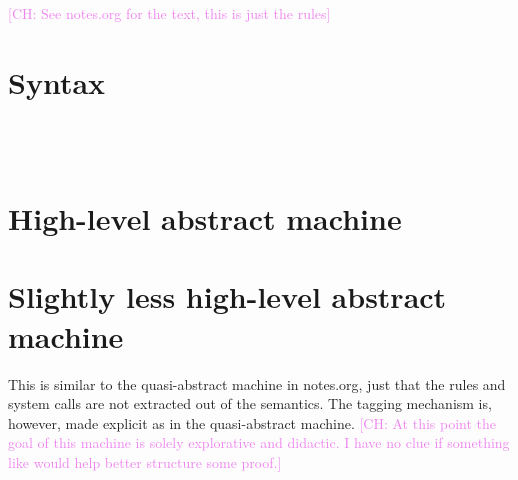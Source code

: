 \documentclass{article}
\newcommand{\comm}[3]{\textcolor{#1}{[#2: #3]}}
\newcommand{\ch}[1]{\comm{violet}{CH}{#1}} %
\begin{document}
\ch{See notes.org for the text, this is just the rules}

\section{Syntax}

\ottmetavars\\[0pt]

\ottgrammartabular{
\ottframe\ottinterrule
\ottp\ottinterrule
\ottn\ottinterrule
\ottu\ottinterrule
\ottinstr\ottinterrule
\otte\ottinterrule
\ottS\ottinterrule
}\\[5.0mm]

\section{High-level abstract machine}

\ottdefnsAbstractHighLevelSmallStep

\section{Slightly less high-level abstract machine}

This is similar to the quasi-abstract machine in notes.org, just that
the rules and system calls are not extracted out of the semantics. The
tagging mechanism is, however, made explicit as in the quasi-abstract
machine.
%
\ch{At this point the goal of this machine is solely explorative and
  didactic. I have no clue if something like would help better
  structure some proof.}

\ottgrammartabular{
\ottT\ottinterrule
\ottTy\ottinterrule
\ottaa\ottinterrule
\ottaS\ottinterrule
}\\[5.0mm]

\ottdefnsAbstractSlightlyLessHighLevelSmallStep
\end{document}
